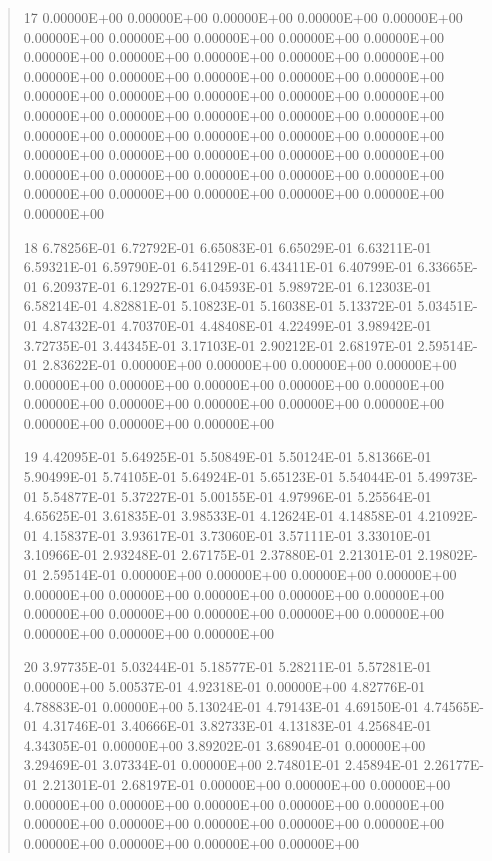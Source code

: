\documentclass[letterpaper,10pt,english]{sphinxmanual}
\begin{document}
\begin{quote}
\begin{DUlineblock}{0em}
\item[] 17   0.00000E+00  0.00000E+00  0.00000E+00  0.00000E+00  0.00000E+00  0.00000E+00  0.00000E+00  0.00000E+00  0.00000E+00  0.00000E+00  0.00000E+00  0.00000E+00  0.00000E+00  0.00000E+00  0.00000E+00  0.00000E+00  0.00000E+00  0.00000E+00  0.00000E+00  0.00000E+00  0.00000E+00  0.00000E+00  0.00000E+00  0.00000E+00  0.00000E+00  0.00000E+00  0.00000E+00  0.00000E+00  0.00000E+00  0.00000E+00  0.00000E+00  0.00000E+00  0.00000E+00  0.00000E+00  0.00000E+00  0.00000E+00  0.00000E+00  0.00000E+00  0.00000E+00  0.00000E+00  0.00000E+00  0.00000E+00  0.00000E+00  0.00000E+00  0.00000E+00  0.00000E+00  0.00000E+00  0.00000E+00  0.00000E+00  0.00000E+00  0.00000E+00
\item[] 18   6.78256E-01  6.72792E-01  6.65083E-01  6.65029E-01  6.63211E-01  6.59321E-01  6.59790E-01  6.54129E-01  6.43411E-01  6.40799E-01  6.33665E-01  6.20937E-01  6.12927E-01  6.04593E-01  5.98972E-01  6.12303E-01  6.58214E-01  4.82881E-01  5.10823E-01  5.16038E-01  5.13372E-01  5.03451E-01  4.87432E-01  4.70370E-01  4.48408E-01  4.22499E-01  3.98942E-01  3.72735E-01  3.44345E-01  3.17103E-01  2.90212E-01  2.68197E-01  2.59514E-01  2.83622E-01  0.00000E+00  0.00000E+00  0.00000E+00  0.00000E+00  0.00000E+00  0.00000E+00  0.00000E+00  0.00000E+00  0.00000E+00  0.00000E+00  0.00000E+00  0.00000E+00  0.00000E+00  0.00000E+00  0.00000E+00  0.00000E+00  0.00000E+00
\item[] 19   4.42095E-01  5.64925E-01  5.50849E-01  5.50124E-01  5.81366E-01  5.90499E-01  5.74105E-01  5.64924E-01  5.65123E-01  5.54044E-01  5.49973E-01  5.54877E-01  5.37227E-01  5.00155E-01  4.97996E-01  5.25564E-01  4.65625E-01  3.61835E-01  3.98533E-01  4.12624E-01  4.14858E-01  4.21092E-01  4.15837E-01  3.93617E-01  3.73060E-01  3.57111E-01  3.33010E-01  3.10966E-01  2.93248E-01  2.67175E-01  2.37880E-01  2.21301E-01  2.19802E-01  2.59514E-01  0.00000E+00  0.00000E+00  0.00000E+00  0.00000E+00  0.00000E+00  0.00000E+00  0.00000E+00  0.00000E+00  0.00000E+00  0.00000E+00  0.00000E+00  0.00000E+00  0.00000E+00  0.00000E+00  0.00000E+00  0.00000E+00  0.00000E+00
\item[] 20   3.97735E-01  5.03244E-01  5.18577E-01  5.28211E-01  5.57281E-01  0.00000E+00  5.00537E-01  4.92318E-01  0.00000E+00  4.82776E-01  4.78883E-01  0.00000E+00  5.13024E-01  4.79143E-01  4.69150E-01  4.74565E-01  4.31746E-01  3.40666E-01  3.82733E-01  4.13183E-01  4.25684E-01  4.34305E-01  0.00000E+00  3.89202E-01  3.68904E-01  0.00000E+00  3.29469E-01  3.07334E-01  0.00000E+00  2.74801E-01  2.45894E-01  2.26177E-01  2.21301E-01  2.68197E-01  0.00000E+00  0.00000E+00  0.00000E+00  0.00000E+00  0.00000E+00  0.00000E+00  0.00000E+00  0.00000E+00  0.00000E+00  0.00000E+00  0.00000E+00  0.00000E+00  0.00000E+00  0.00000E+00  0.00000E+00  0.00000E+00  0.00000E+00

\end{DUlineblock}
\end{quote}
\end{document}
